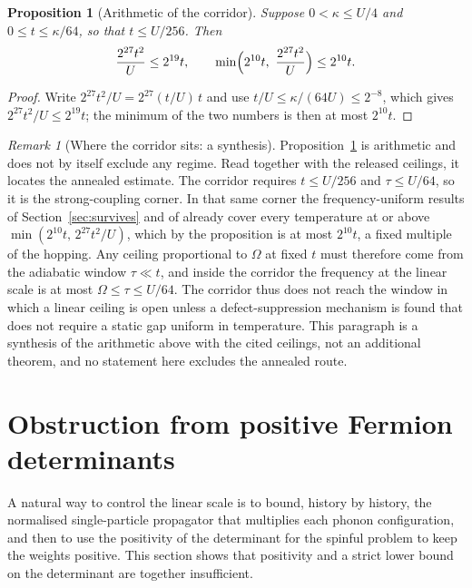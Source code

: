 \documentclass[11pt]{article}
\newtheorem{proposition}[theorem]{Proposition}
\theoremstyle{definition}
\theoremstyle{remark}
\newtheorem{remark}[theorem]{Remark}
\begin{document}
\begin{proposition}[Arithmetic of the corridor]
\label{prop:collapse}
Suppose $0<\kappa\le U/4$ and $0\le t\le\kappa/64$, so that $t\le U/256$. Then
\begin{equation}
\frac{2^{27}t^2}{U}\le2^{19}t,\qquad
\min\Bigl(2^{10}t,\ \frac{2^{27}t^2}{U}\Bigr)\le2^{10}t .
\label{eq:collapse}
\end{equation}
\end{proposition}

\begin{proof}
Write $2^{27}t^2/U=2^{27}(t/U)\,t$ and use $t/U\le\kappa/(64U)\le2^{-8}$, which gives
$2^{27}t^2/U\le2^{19}t$; the minimum of the two numbers is then at most $2^{10}t$.
\end{proof}

\begin{remark}[Where the corridor sits: a synthesis]
\label{rem:corridor}
Proposition~\ref{prop:collapse} is arithmetic and does not by itself exclude any
regime. Read together with the released ceilings, it locates the annealed estimate.
The corridor requires $t\le U/256$ and $\tau\le U/64$, so it is the strong-coupling
corner. In that same corner the frequency-uniform results of
Section~\ref{sec:survives} and of \cite{stage6} already cover every temperature at or
above $\min(2^{10}t,\,2^{27}t^2/U)$, which by the proposition is at most $2^{10}t$, a
fixed multiple of the hopping. Any ceiling proportional to $\Omega$ at fixed $t$ must
therefore come from the adiabatic window $\tau\ll t$, and inside the corridor the
frequency at the linear scale is at most $\Omega\le\tau\le U/64$.
The corridor thus does not reach the window in which a linear ceiling is open unless a
defect-suppression mechanism is found that does not require a static gap uniform in
temperature. This paragraph is a synthesis of the arithmetic above with the cited
ceilings, not an additional theorem, and no statement here excludes the annealed
route.
\end{remark}

\section{Obstruction from positive Fermion determinants}
\label{sec:det}

A natural way to control the linear scale is to bound, history by history, the
normalised single-particle propagator that multiplies each phonon configuration, and
then to use the positivity of the determinant for the spinful problem to keep the
weights positive. This section shows that positivity and a strict lower bound on the
determinant are together insufficient.
\end{document}
